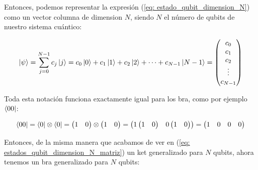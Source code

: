 \documentclass{article}
\numberwithin{equation}{section} %
\begin{document}
    \vspace{2.5mm}

    Entonces, podemos representar la expresión (\ref{eq: estado_qubit_dimension_N}) como un vector columna de dimension \( N \), siendo \( N \) el número de qubits de nuestro sistema cuántico:

    \begin{equation}
        \ket{\psi} = \sum_{j = 0}^{N - 1} c_{j} \ket{j} = c_{0} \ket{0} + c_{1} \ket{1} + c_{2} \ket{2} + \cdots + c_{N - 1} \ket{N - 1} = \begin{pmatrix}
            c_{0} \\
            c_{1} \\
            c_{2} \\
            \vdots \\
            c_{N - 1}
        \end{pmatrix}
        \label{eq: estados_qubit_dimension_N_matriz}
    \end{equation}

    \vspace{2.5mm}

    Toda esta notación funciona exactamente igual para los bra, como por ejemplo \( \bra{0 0} \):

    \begin{equation*}
        \bra{0 0} = \bra{0} \otimes \bra{0} = \begin{pmatrix}
            1 & 0
        \end{pmatrix} \otimes \begin{pmatrix}
            1 & 0
        \end{pmatrix} = \begin{pmatrix}
            1 \begin{pmatrix} 1 & 0 \end{pmatrix} & 0 \begin{pmatrix} 1 & 0 \end{pmatrix}
        \end{pmatrix} = \begin{pmatrix}
            1 & 0 & 0 & 0
        \end{pmatrix}
    \end{equation*}

    \vspace{2.5mm}

    Entonces, de la misma manera que acabamos de ver en (\ref{eq: estados_qubit_dimension_N_matriz}) un ket generalizado para \( N \) qubits, ahora tenemos un bra generalizado para \( N \) qubits:
\end{document}
